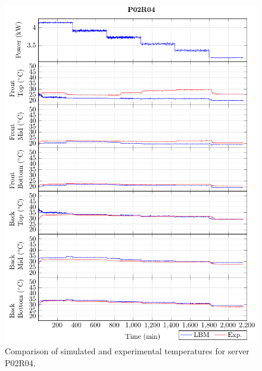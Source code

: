 \begin{figure}[!htb]
\centering
\includegraphics[width=\linewidth]{Plots/P02R04_T.pdf}
\caption{Comparison of simulated and experimental temperatures for server P02R04.}
\label{fig:P02R04_plot}
\end{figure}

\clearpage

